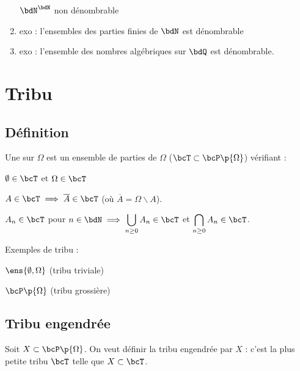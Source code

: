 \documentclass[a4paper,french,bookmarks]{book}
\begin{document}
    \begin{enumerate}
        \itt $\bdN^\bdN$ non dénombrable
        
        \item exo : l'ensembles des parties finies de $\bdN$ est dénombrable
        
        \item exo : l'ensemble des nombres algébriques sur $\bdQ$ est dénombrable.
    \end{enumerate}
    
    \section{Tribu}
    
    \subsection{Définition}
    
    \begin{definition}{}
        Une  sur $\Omega$ est un ensemble de parties de $\Omega$ (\ie $\bcT \subset \bcP\p{\Omega}$) vérifiant :
        \begin{psse}
            \item $\emptyset \in \bcT$ et $\Omega \in \bcT$
            
            \item $A \in \bcT \implies \overline A \in \bcT$ (où $\overline A = \Omega \backslash A$).
            
            \item $A_n \in \bcT$ pour $n \in \bdN \implies \displaystyle\bigcup_{n \geq 0} A_n \in \bcT$ et $\displaystyle\bigcap_{n \geq 0} A_n \in \bcT$.
        \end{psse}
    \end{definition}
    
    Exemples de tribu :
    \begin{enumerate}
        \itt $\ens{\emptyset, \Omega}$ (tribu triviale)
        
        \itt $\bcP\p{\Omega}$ (tribu grossière)
    \end{enumerate}
    
    \subsection{Tribu engendrée}
    
    Soit $X \subset \bcP\p{\Omega}$. On veut définir la tribu engendrée par $X$ : c'est la plus petite tribu $\bcT$ telle que $X \subset \bcT$. 
    
\end{document}
